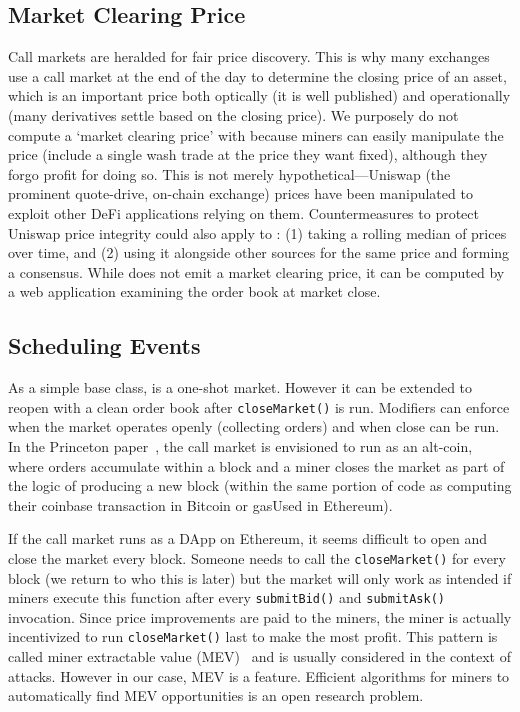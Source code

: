 \subsection{Market Clearing Price}

Call markets are heralded for fair price discovery. This is why many exchanges use a call market at the end of the day to determine the closing price of an asset, which is an important price both optically (it is well published) and operationally (many derivatives settle based on the closing price). We purposely do not compute a `market clearing price' with \cm because miners can easily manipulate the price (\ie include a single wash trade at the price they want fixed), although they forgo profit for doing so. This is not merely hypothetical---Uniswap (the prominent quote-drive, on-chain exchange) prices have been manipulated to exploit other DeFi applications relying on them. Countermeasures to protect Uniswap price integrity could also apply to \cm: (1) taking a rolling median of prices over time, and (2) using it alongside other sources for the same price and forming a consensus. While \cm does not emit a market clearing price, it can be computed by a web application examining the order book at market close. 

\subsection{Scheduling Events}

As a simple base class, \cm is a one-shot market. However it can be extended to reopen with a clean order book after \texttt{closeMarket()} is run. Modifiers can enforce when the market operates openly (collecting orders) and when close can be run. In the Princeton paper~\cite{clark2014decentralizing}, the call market is envisioned to run as an alt-coin, where orders accumulate within a block and a miner closes the market as part of the logic of producing a new block (\ie within the same portion of code as computing their coinbase transaction in Bitcoin or gasUsed in Ethereum). 

If the call market runs as a DApp on Ethereum, it seems difficult to open and close the market every block. Someone needs to call the \texttt{closeMarket()} for every block (we return to who this is later) but the market will only work as intended if miners execute this function after every \texttt{submitBid()} and \texttt{submitAsk()} invocation. Since price improvements are paid to the miners, the miner is actually incentivized to run \texttt{closeMarket()} last to make the most profit. This pattern is called miner extractable value (MEV)~\cite{daian2019flash} and is usually considered in the context of attacks. However in our case, MEV is a feature. Efficient algorithms for miners to automatically find MEV opportunities is an open research problem.

